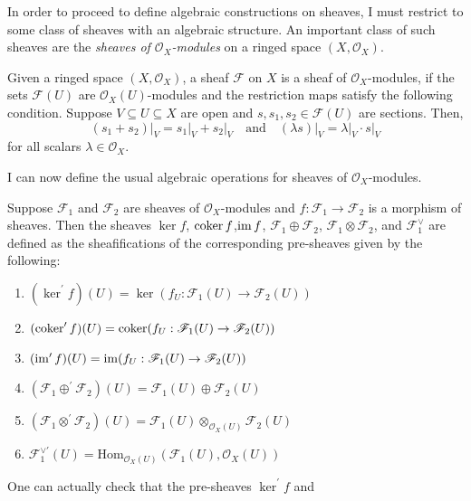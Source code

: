 In order to proceed to define algebraic constructions on sheaves, I must
restrict to some class of sheaves with an algebraic structure. An important
class of such sheaves are the \emph{sheaves of $\mathscr{O}_{X}$-modules}
on a ringed space $(X,\mathscr{O}_{X})$.
\begin{defin}
  Given a ringed space $(X,\mathscr{O}_{X})$, a sheaf $\mathscr{F}$ on $X$
  is a sheaf of $\mathscr{O}_{X}$-modules, if the sets $\mathscr{F}(U)$
  are $\mathscr{O}_{X}(U)$-modules and the restriction maps satisfy the
  following condition. Suppose $V\subseteq U\subseteq X$ are open and
  $s,s_{1}, s_{2}\in\mathscr{F}(U)$ are sections. Then,
  \[
    (s_{1}+s_{2})\vert_{V}=s_{1}\vert_{V}+s_{2}\vert_{V}\quad
    \text{and}\quad (\lambda s)\vert_{V}=\lambda\vert_{V}\cdot s\vert_{V}
  \]
  for all scalars $\lambda\in\mathscr{O}_{X}$.
\end{defin}
I can now define the usual algebraic operations for sheaves of
$\mathscr{O}_{X}$-modules.
\begin{defin}\label{def:sheaf_algebra}
  Suppose $\mathscr{F}_{1}$ and $\mathscr{F}_{2}$ are sheaves of
  $\mathscr{O}_{X}$-modules and $f:\mathscr{F}_{1}\to\mathscr{F}_{2}$ is a
  morphism of sheaves. Then the sheaves $\ker f$, $\operatorname{coker} f$,$\operatorname{im} f$,
  $\mathscr{F}_{1}\oplus\mathscr{F}_{2}$, $\mathscr{F}_{1}\otimes
  \mathscr{F}_{2}$, and $\mathscr{F}_{1}^{\vee}$ are defined as the
  sheafifications of the corresponding pre-sheaves given by the following:
  \begin{enumerate}
    \item $(\ker^{\prime} f)(U) = \ker(f_{U}:\mathscr{F}_{1}(U)
          \to\mathscr{F}_{2}(U))$
    \item $(\operatorname{coker}^{\prime} f)(U) = \operatorname{coker}(f_{U}:\mathscr{F}_{1}(U)
          \to\mathscr{F}_{2}(U))$
    \item $(\operatorname{im}^{\prime} f)(U)=\operatorname{im}(f_{U}:\mathscr{F}_{1}(U)
          \to\mathscr{F}_{2}(U))$
    \item $(\mathscr{F}_{1}\oplus^{\prime}\mathscr{F}_{2})(U)=\mathscr{F}_{1}(U)
          \oplus\mathscr{F}_{2}(U)$
    \item $(\mathscr{F}_{1}\otimes^{\prime}\mathscr{F}_{2})(U)
          =\mathscr{F}_{1}(U)\otimes_{\mathscr{O}_{X}(U)}\mathscr{F}_{2}(U)$
    \item $\mathscr{F}_{1}^{\vee\prime}(U)=\text{Hom}_{\mathscr{O}_{X}(U)}(
          \mathscr{F}_{1}(U),\mathscr{O}_{X}(U))$
  \end{enumerate}
\end{defin}
One can actually check that the pre-sheaves $\ker^{\prime} f$ and
